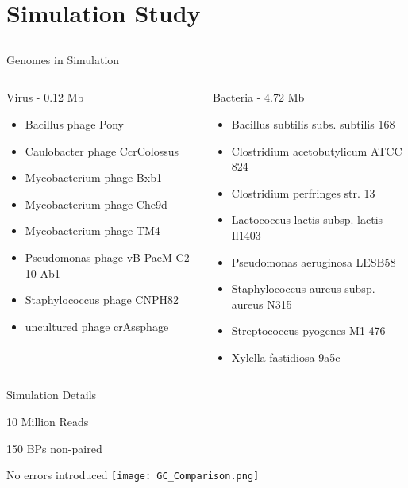 \documentclass[11pt]{beamer}
\begin{document}
	
\section{Simulation Study}
\subsection{}
	
	\begin{frame}{Genomes in Simulation}
	\begin{columns}
			\begin{block}{Virus - 0.12 Mb}
			\begin{itemize}
			\item Bacillus phage Pony
			\item Caulobacter phage CcrColossus
			\item Mycobacterium phage Bxb1
			\item Mycobacterium phage Che9d
			\item Mycobacterium phage TM4
			\item Pseudomonas phage vB-PaeM-C2-10-Ab1
			\item Staphylococcus phage CNPH82
			\item uncultured phage crAssphage
			\end{itemize}
			\end{block}	
			\begin{block}{Bacteria - 4.72 Mb}
			\begin{itemize}
			\item Bacillus subtilis subs. subtilis 168
			\item Clostridium acetobutylicum ATCC 824
			\item Clostridium perfringes str. 13
			\item Lactococcus lactis subsp. lactis Il1403
			\item Pseudomonas aeruginosa LESB58
			\item Staphylococcus aureus subsp. aureus N315
			\item Streptococcus pyogenes M1 476
			\item Xylella fastidiosa 9a5c
			\end{itemize}
			\end{block}
	\end{columns}
	\end{frame}
	
	\begin{frame}{Simulation Details}
	\begin{description}
	\item[Library Size] 10 Million Reads
	\item[Insert Size] 150 BPs non-paired
	\item[Error Rate] No errors introduced
	\vspace{.5cm}
	\texttt{[image: GC\_Comparison.png]} 
	\end{description}
	\end{frame}
	
\end{document}
